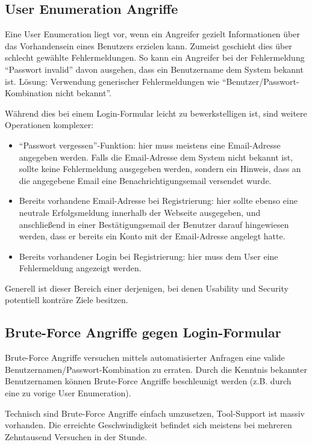 \subsection{User Enumeration Angriffe}

Eine User Enumeration liegt vor, wenn ein Angreifer gezielt Informationen über das Vorhandensein eines Benutzers erzielen kann. Zumeist geschieht dies über schlecht gewählte Fehlermeldungen. So kann ein Angreifer bei der Fehlermeldung ``Passwort invalid'' davon ausgehen, dass ein Benutzername dem System bekannt ist. Lösung: Verwendung generischer Fehlermeldungen wie ``Benutzer/Passwort-Kombination nicht bekannt''.

Während dies bei einem Login-Formular leicht zu bewerkstelligen ist, sind weitere Operationen komplexer:

\begin{itemize}
	\item ``Passwort vergessen''-Funktion: hier muss meistens eine Email-Adresse angegeben werden. Falls die Email-Adresse dem System nicht bekannt ist, sollte keine Fehlermeldung ausgegeben werden, sondern ein Hinweis, dass an die angegebene Email eine Benachrichtigungsemail versendet wurde.
	\item Bereits vorhandene Email-Adresse bei Registrierung: hier sollte ebenso eine neutrale Erfolgsmeldung innerhalb der Webseite ausgegeben, und anschließend in einer Bestätigungsemail der Benutzer darauf hingewiesen werden, dass er bereits ein Konto mit der Email-Adresse angelegt hatte.
	\item Bereits vorhandener Login bei Registrierung: hier muss dem User eine Fehlermeldung angezeigt werden.
\end{itemize}

Generell ist dieser Bereich einer derjenigen, bei denen Usability und Security potentiell konträre Ziele besitzen.

\subsection{Brute-Force Angriffe gegen Login-Formular}

Brute-Force Angriffe versuchen mittels automatisierter Anfragen eine valide Benutzernamen/Passwort-Kombination zu erraten. Durch die Kenntnis bekannter Benutzernamen können Brute-Force Angriffe beschleunigt werden (z.B. durch eine zu vorige User Enumeration).

Technisch sind Brute-Force Angriffe einfach umzusetzen, Tool-Support ist massiv vorhanden. Die erreichte Geschwindigkeit befindet sich meistens bei mehreren Zehntausend Versuchen in der Stunde.

